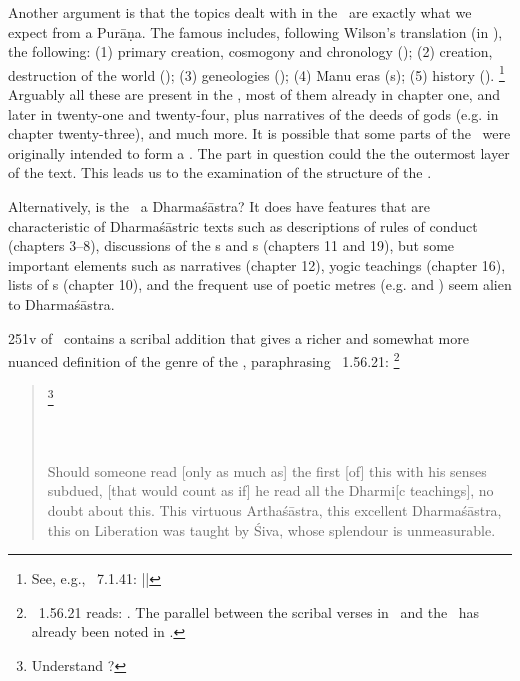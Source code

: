 Another argument is that the topics dealt with in the \VSS\ are exactly what
we expect from a Purāṇa. The famous  includes,
following Wilson's translation (in ), the following:
(1) primary creation, cosmogony and chronology (); 
(2) creation, destruction of the world ();
(3) geneologies (); 
(4) Manu eras (s);
(5) history ().%
		\footnote{See, e.g., \SIVP\ 7.1.41: 
				 ||}
Arguably all these are present in the \VSS, most of them already in chapter one, and later in twenty-one and
twenty-four, plus narratives of the deeds of gods (e.g. in chapter twenty-three), and much more. It is possible
that some parts of the \VSS\ were originally intended
to form a . The part in question could
the the outermost layer of the text. This leads us
to the examination of the structure of the \VSS.


Alternatively, is the \VSS\ a Dharmaśāstra?  It does have features  
that are characteristic of Dharmaśāstric texts such as
descriptions of rules of conduct (chapters 3--8), discussions
of the s and s (chapters 11 and 19),
but some important elements such as narratives (chapter 12),
yogic teachings (chapter 16), lists of s (chapter 10),
and the frequent use of poetic metres (e.g.  and
) seem alien to Dharmaśāstra.

\Fol251v of \msPaperA\ contains a scribal addition that 
gives a richer and somewhat more nuanced definition of the genre of the \VSS, 
paraphrasing \MBh\ 1.56.21:%
			\footnote{\MBh\ 1.56.21 reads:
									. 
		                              The parallel between the scribal verses in \msPaperA\ and the 
		                              \MBh\ has already been noted in 
		                              .}

\begin{quote}
% 
		\footnote{Understand ?}
							\\
\\
\\

Should someone read [only as much as] the first  [of]
this  with his senses subdued, [that would count as if]
he read all the Dharmi[c teachings], no doubt about this.
This virtuous Arthaśāstra, this excellent Dharmaśāstra, 
this  on Liberation was taught by Śiva, whose splendour is
unmeasurable.
\end{quote}

